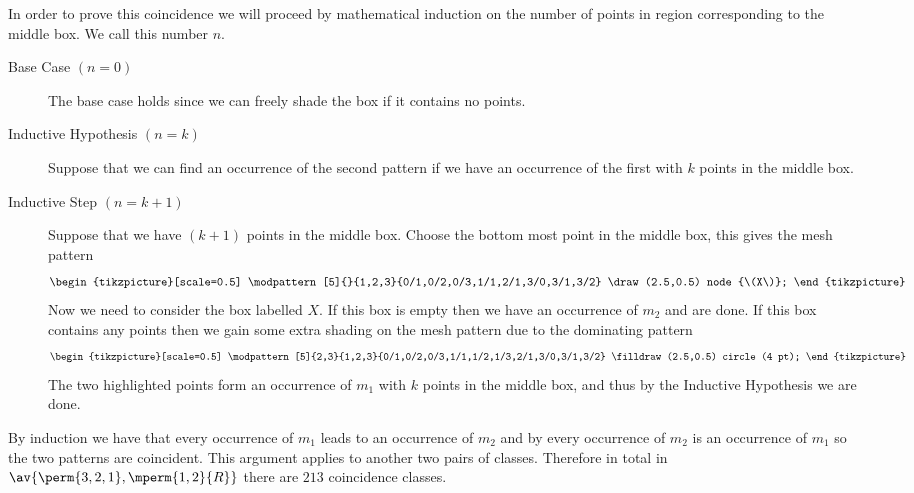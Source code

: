 In order to prove this coincidence we will proceed by mathematical
induction on the number of points in region corresponding to the middle box.
We call this number \(n\).
\begin{description}
    \item [Base Case \((n=0)\)] The base case holds since we can freely shade the
        box if it contains no points.
    \item [Inductive Hypothesis \((n=k)\)] Suppose that we can find an occurrence
        of the second pattern if we have an occurrence of the first with \(k\) points
        in the middle box.
    \item [Inductive Step \((n=k+1)\)] Suppose that we have \((k+1)\) points in
        the middle box. Choose the bottom most point in the middle box, this gives the
        mesh pattern
     \begin{equation*}
        \begin{tikzpicture}[scale=0.5]
            \modpattern[5]{}{1,2,3}{0/1,0/2,0/3,1/1,2/1,3/0,3/1,3/2}
            \draw (2.5,0.5) node {\(X\)};
        \end{tikzpicture}
    \end{equation*}
        Now we need to consider the box labelled \(X\). If this box is empty then
        we have an occurrence of \(m_2\) and are done. If this box contains
        any points then we gain some extra shading on the mesh pattern
        due to the dominating pattern
     \begin{equation*}
        \begin{tikzpicture}[scale=0.5]
            \modpattern[5]{2,3}{1,2,3}{0/1,0/2,0/3,1/1,1/2,1/3,2/1,3/0,3/1,3/2}
            \filldraw (2.5,0.5) circle (4 pt);
        \end{tikzpicture}
    \end{equation*}
        The two highlighted points form an occurrence of \(m_1\) with \(k\)
        points in the middle box, and thus by the Inductive Hypothesis we
        are done.
\end{description}
By induction we have that every occurrence of \(m_1\) leads to an occurrence of \(m_2\)
and by  every occurrence of \(m_2\) is an occurrence of
\(m_1\) so the two patterns are coincident.
This argument applies to another two pairs of classes. Therefore in
total in \(\av{\perm{3,2,1}, \mperm{1,2}{R}}\) there are \(213\) coincidence
classes.
